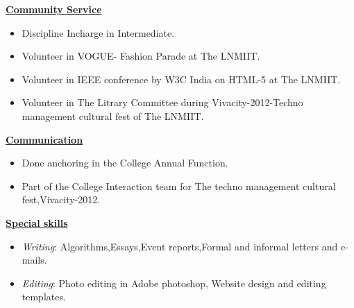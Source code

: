 \documentclass{article}
\begin{document}
\vspace{.1in}
\begin{center}\Large{\bf \underline{Community Service}}\end{center}\vspace{.1in}
\begin{itemize}
\item Discipline Incharge in Intermediate.
\item Volunteer in VOGUE- Fashion Parade at The LNMIIT.
\item Volunteer in IEEE conference by W3C India on HTML-5 at The LNMIIT.
\item Volunteer in The Litrary Committee during Vivacity-2012-Techno management cultural fest of The LNMIIT.
\end{itemize}
\vspace{.1in}
\begin{center}\Large{\bf \underline{Communication}}\end{center}\vspace{.1in}
\begin{itemize}
\item Done anchoring in the College Annual Function.
\item Part of the College Interaction team for The techno management cultural fest,Vivacity-2012.
\end{itemize}
\vspace{.1in}
\begin{center}\Large{\bf \underline{Special skills}}\end{center}\vspace{.1in}
\begin{itemize}
\item \emph{Writing}: Algorithms,Essays,Event reports,Formal and informal letters and e-mails.
\item \emph{Editing}: Photo editing in Adobe photoshop, Website design and editing templates.
\end{itemize}
\end{document}
